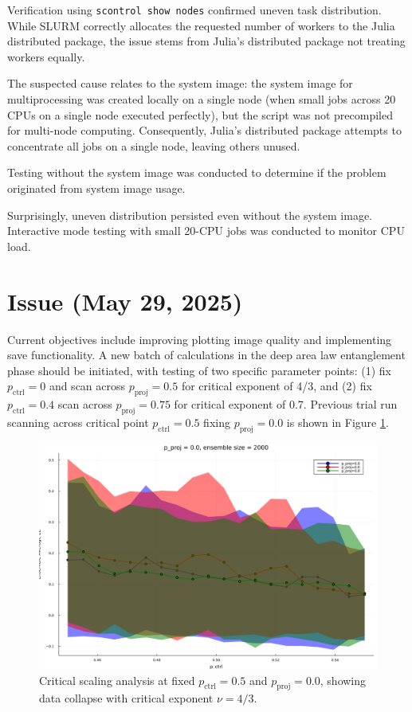 \documentclass[11pt,a4paper]{article}
\begin{document}
Verification using \texttt{scontrol show nodes} confirmed uneven task distribution. While SLURM correctly allocates the requested number of workers to the Julia distributed package, the issue stems from Julia's distributed package not treating workers equally.

The suspected cause relates to the system image: the system image for multiprocessing was created locally on a single node (when small jobs across 20 CPUs on a single node executed perfectly), but the script was not precompiled for multi-node computing. Consequently, Julia's distributed package attempts to concentrate all jobs on a single node, leaving others unused.

Testing without the system image was conducted to determine if the problem originated from system image usage.

Surprisingly, uneven distribution persisted even without the system image. Interactive mode testing with small 20-CPU jobs was conducted to monitor CPU load.

\section{Issue (May 29, 2025)}

Current objectives include improving plotting image quality and implementing save functionality. A new batch of calculations in the deep area law entanglement phase should be initiated, with testing of two specific parameter points: (1) fix $p_\text{ctrl}=0$ and scan across $p_\text{proj}=0.5$ for critical exponent of 4/3, and (2) fix $p_\text{ctrl} = 0.4$ scan across $p_\text{proj} = 0.75$ for critical exponent of 0.7. Previous trial run scanning across critical point $p_\text{ctrl} = 0.5$ fixing $p_\text{proj} = 0.0$ is shown in Figure \ref{fig:critical_scaling_pctrl05}.

\begin{figure}[H]
    \centering
    \includegraphics[width=0.8\linewidth]{p_ctrl0.5p_proj0.0.png}
    \caption{Critical scaling analysis at fixed $p_\text{ctrl}=0.5$ and $p_\text{proj}=0.0$, showing data collapse with critical exponent $\nu=4/3$.}
    \label{fig:critical_scaling_pctrl05}
\end{figure}
\end{document}
